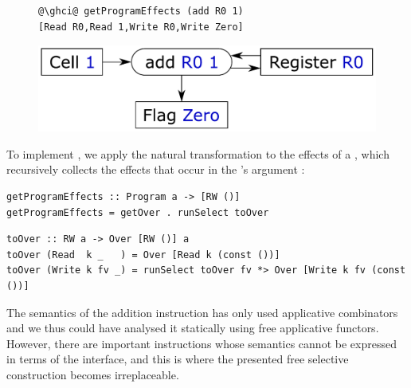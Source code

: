 
\vspace{-1mm}
\begin{figure}[!h]
\begin{minipage}{0.53\textwidth}
\raggedleft
\begin{verbatim}
@\ghci@ getProgramEffects (add R0 1)
[Read R0,Read 1,Write R0,Write Zero]
\end{verbatim}
 \end{minipage}
 \begin{minipage}{0.44\textwidth}
  \centering
  \includegraphics[scale=0.3]{fig/add.pdf}
 \end{minipage}
\end{figure}
\vspace{-1mm}

\noindent
To implement , we apply the natural transformation
 to the effects of a , which recursively collects the
effects that occur in the 's argument :

\vspace{0.5mm}
\begin{verbatim}
getProgramEffects :: Program a -> [RW ()]
getProgramEffects = getOver . runSelect toOver
\end{verbatim}
\vspace{1mm}
\begin{verbatim}
toOver :: RW a -> Over [RW ()] a
toOver (Read  k _   ) = Over [Read k (const ())]
toOver (Write k fv _) = runSelect toOver fv *> Over [Write k fv (const ())]
\end{verbatim}
\vspace{0.5mm}

\noindent
The semantics of the addition instruction has only used applicative combinators
and we thus could have analysed it statically using free applicative functors.
However, there are important instructions whose semantics cannot be expressed
in terms of the  interface, and this is where the presented
free selective construction becomes irreplaceable.

